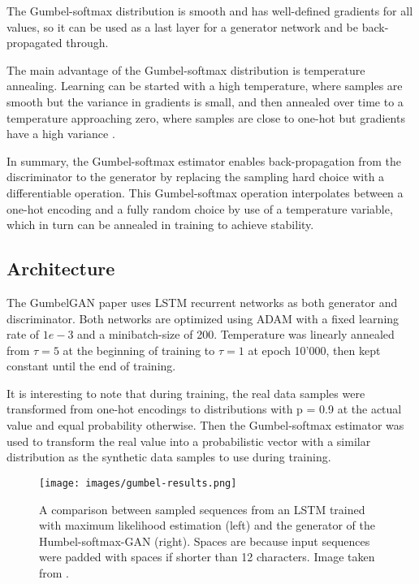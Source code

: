 \documentclass[a4paper,conference]{IEEEtran}
\begin{document}
The Gumbel-softmax distribution is smooth and has well-defined gradients for all values, so it can be used as a last layer for a generator network and be back-propagated through. 

The main advantage of the Gumbel-softmax distribution is temperature annealing. Learning can be started with a high temperature, where samples are smooth but the variance in gradients is small, and then annealed over time to a temperature approaching zero, where samples are close to one-hot but gradients have a high variance \cite{c14}.

In summary, the Gumbel-softmax estimator enables back-propagation from the discriminator to the generator by replacing the sampling hard choice with a differentiable operation. This Gumbel-softmax operation interpolates between a one-hot encoding and a fully random choice by use of a temperature variable, which in turn can be annealed in training to achieve stability.
   
\subsection{Architecture}
The GumbelGAN paper \cite{c13} uses LSTM recurrent networks \cite{c9} as both generator and discriminator. Both networks are optimized using ADAM \cite{c16} with a fixed learning rate of $1e-3$ and a minibatch-size of 200. Temperature was linearly annealed from $\tau = 5$ at the beginning of training to $\tau = 1$ at epoch 10'000, then kept constant until the end of training.

It is interesting to note that during training, the real data samples were transformed from one-hot encodings to distributions with p = 0.9 at the actual value and equal probability otherwise. Then the Gumbel-softmax estimator was used to transform the real value into a probabilistic vector with a similar distribution as the synthetic data samples to use during training.

   \begin{figure}[thpb]
      \centering
      \texttt{[image: images/gumbel-results.png]}
      \caption{A comparison between sampled sequences from an LSTM trained with maximum likelihood estimation (left) and the generator of the Humbel-softmax-GAN (right). Spaces are because input sequences were padded with spaces if shorter than 12 characters. Image taken from \cite{c14}.}
      \label{figurelabel}
      \label{fig:gumbel-results}
   \end{figure}
\end{document}
